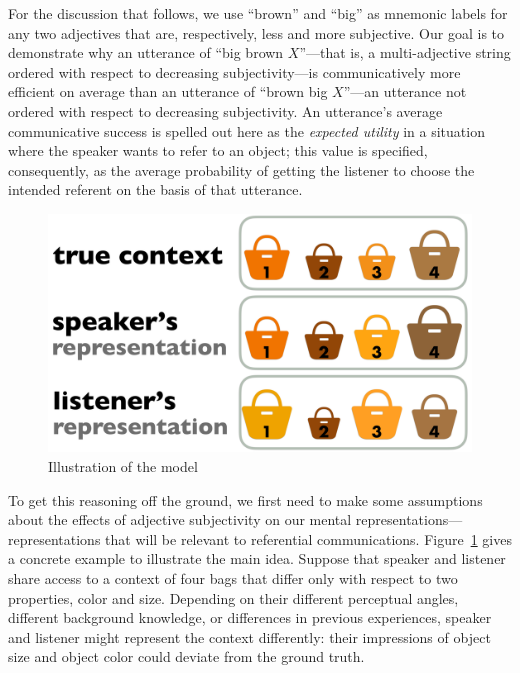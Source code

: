 \documentclass[10pt,a4paper]{article}
\begin{document}
For the discussion that follows, we use ``brown'' and ``big'' as mnemonic labels for any two adjectives that are, respectively, less and more subjective. Our goal is to demonstrate why an utterance of ``big brown $X$''---that is, a multi-adjective string ordered with respect to decreasing subjectivity---is communicatively more efficient on average than an utterance of ``brown big $X$''---an utterance not ordered with respect to decreasing subjectivity. An utterance's average communicative success is spelled out here as the \emph{expected utility} in a situation where the speaker wants to refer to an object; this value is specified, consequently, as the average probability of getting the listener to choose the intended referent on the basis of that utterance.

\begin{figure}[t]
  \centering
 \includegraphics[width=\linewidth]{model_picture.pdf} 
  \caption{Illustration of the model}
  \label{fig:ModelIllustration}
\end{figure}

To get this reasoning off the ground, we first need to make some assumptions about the effects of adjective subjectivity on our mental representations---representations that will be relevant to referential communications. Figure~\ref{fig:ModelIllustration} gives a concrete example to illustrate the main idea. Suppose that speaker and listener share access to a context of four bags that differ only with respect to two properties, color and size. Depending on their different perceptual angles, different background knowledge, or differences in previous experiences, speaker and listener might represent the context differently: their impressions of object size and object color could deviate from the ground truth. 
\end{document}
